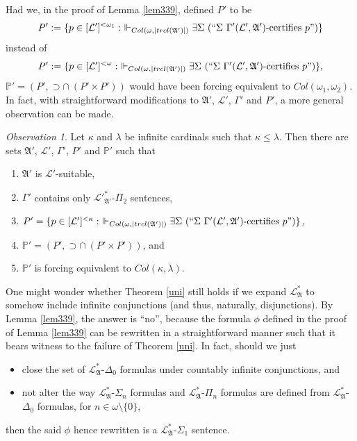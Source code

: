 \documentclass[12pt, twoside]{memoir}
\numberwithin{equation}{section}
\theoremstyle{definition}
\theoremstyle{remark}
\newtheorem{ob}[thm]{Observation}
\theoremstyle{definition}
\theoremstyle{definition}
\theoremstyle{definition}
\theoremstyle{remark}
\begin{document}
Had we, in the proof of Lemma \ref{lem339}, defined $P'$ to be
\begin{equation*}
    P' := \{p \in [\mathcal{L}']^{< \omega_1} : \ \Vdash_{Col(\omega, |trcl(\mathfrak{A}')|)} \exists \Sigma \ (``\Sigma \ \Gamma'(\mathcal{L}', \mathfrak{A}') \text{-certifies } p")\}
\end{equation*}
instead of
\begin{equation*}
    P' := \{p \in [\mathcal{L}']^{< \omega} : \ \Vdash_{Col(\omega, |trcl(\mathfrak{A}')|)} \exists \Sigma \ (``\Sigma \ \Gamma'(\mathcal{L}', \mathfrak{A}') \text{-certifies } p")\} \text{,}
\end{equation*}
$\mathbb{P}' = (P', \supset \cap \ (P' \times P'))$ would have been forcing equivalent to $Col(\omega_1, \omega_2)$. In fact, with straightforward modifications to $\mathfrak{A}'$, $\mathcal{L}'$, $\Gamma'$ and $P'$, a more general observation can be made.

\begin{ob}\label{ob259}
Let $\kappa$ and $\lambda$ be infinite cardinals such that $\kappa \leq \lambda$. Then there are sets $\mathfrak{A}'$, $\mathcal{L}'$, $\Gamma'$, $P'$ and $\mathbb{P}'$ such that
\begin{enumerate}[label=(\alph*)]
    \item $\mathfrak{A}'$ is $\mathcal{L}'$-suitable, 
    \item $\Gamma'$ contains only $\mathcal{L}'^*_{\mathfrak{A}'}$-$\Pi_2$ sentences,
    \item $P' = \{p \in [\mathcal{L}']^{< \kappa} : \ \Vdash_{Col(\omega, |trcl(\mathfrak{A}')|)} \exists \Sigma \ (``\Sigma \ \Gamma' (\mathcal{L}', \mathfrak{A}') \text{-certifies } p")\}$,
    \item $\mathbb{P}' = (P', \supset \cap \ (P' \times P'))$, and
    \item $\mathbb{P}'$ is forcing equivalent to $Col(\kappa, \lambda)$.
\end{enumerate}
\end{ob}

One might wonder whether Theorem \ref{uni} still holds if we expand $\mathcal{L}^{*}_{\mathfrak{A}}$ to somehow include infinite conjunctions (and thus, naturally, disjunctions). By Lemma \ref{lem339}, the answer is ``no'', because the formula $\phi$ defined in the proof of Lemma \ref{lem339} can be rewritten in a straightforward manner such that it bears witness to the failure of Theorem \ref{uni}. In fact, should we just 
\begin{itemize}
    \item close the set of $\mathcal{L}^{*}_{\mathfrak{A}}$-$\Delta_0$ formulas under countably infinite conjunctions, and
    \item not alter the way $\mathcal{L}^{*}_{\mathfrak{A}}$-$\Sigma_n$ formulas and $\mathcal{L}^{*}_{\mathfrak{A}}$-$\Pi_n$ formulas are defined from $\mathcal{L}^{*}_{\mathfrak{A}}$-$\Delta_0$ formulas, for $n \in \omega \setminus \{0\}$,
\end{itemize}
then the said $\phi$ hence rewritten is a $\mathcal{L}^{*}_{\mathfrak{A}}$-$\Sigma_1$ sentence.
\end{document}
